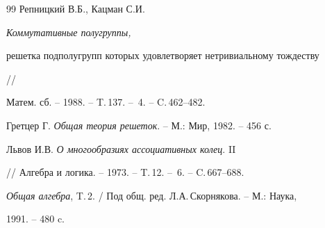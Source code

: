 \begin{thebibliography}{99}
Репницкий В.Б., Кацман С.И. {\em Коммутативные полугруппы,


решетка подполугрупп которых удовлетворяет нетривиальному тождеству} //


Матем. сб. -- 1988. -- T.\,137. -- \No\,4. -- C.\,462--482.







Гретцер Г. {\em Общая теория решеток}. -- М.: Мир, 1982. -- 456 с.







Львов И.В. {\em О многообразиях ассоциативных колец}. II


// Алгебра и логика. -- 1973. -- T.\,12. -- \No\,6. -- C.\,667--688.







{\em Общая алгебра}, T.\,2. / Под общ. ред. Л.А.\,Скорнякова. -- М.: Наука,


1991. -- 480 c.





\end{thebibliography}





\vskip 2cm
























